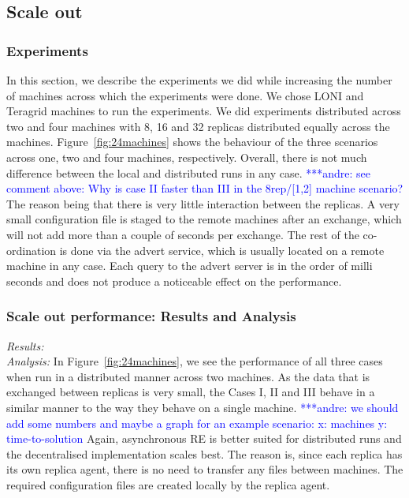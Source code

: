 \documentclass{rspublic}
\newcommand{\alnote}[1]{ {\textcolor{blue} { ***andre: #1 }}}
\newcommand{\alnote}[1]{}
\begin{document}
\subsection{Scale out}

\subsubsection{Experiments}
In this section, we describe the experiments we did while increasing
the number of machines across which the experiments were done. We
chose LONI and Teragrid machines to run the experiments. We did
experiments distributed across two and four machines with 8, 16 and 32
replicas distributed equally across the machines.
Figure~\ref{fig:24machines} shows the behaviour of the three scenarios 
across one, two and four machines,
respectively. Overall, there is not much difference between the local
and distributed runs in any case. \alnote{see comment above: Why is case II faster than III 
in the 8rep/[1,2] machine scenario?} The reason being that there is very
little interaction between the replicas. A very small configuration
file is staged to the remote machines after an exchange, which will
not add more than a couple of seconds per exchange. The rest of the
co-ordination is done via the advert service, which is usually located
on a remote machine in any case. Each query to the advert server is in
the order of milli seconds and does not produce a noticeable effect on
the performance.

\subsubsection{Scale out performance: Results and Analysis}

{\it Results:}\\


{\it Analysis: } In Figure~\ref{fig:24machines}, we see the performance
of all three cases when run in a distributed manner across two
machines. As the data that is exchanged between replicas is very
small, the Cases I, II and III behave in a similar manner to the way
they behave on a single machine. \alnote{we should add some numbers
  and maybe a graph for an example scenario: x: machines y:
  time-to-solution} Again, asynchronous RE is better suited for
distributed runs and the decentralised implementation scales best. The
reason is, since each replica has its own replica agent, there is no
need to transfer any files between machines. The required
configuration files are created locally by the replica agent.
\end{document}
